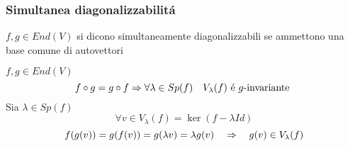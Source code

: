\subsubsection{Simultanea diagonalizzabilit\'a }
\begin{defn}\bianco
$f,g\in End(V) $ si dicono simultaneamente diagonalizzabili se ammettono una base comune di autovettori
\end{defn}
\spazio
\begin{lem}
$f,g \in End(V) $ 
$$ f \circ g = g \circ f \Rightarrow \forall \lambda\in Sp(f) \quad V_\lambda(f) \text{ \'e } g\text{-invariante } $$
\proof
Sia $\lambda \in Sp(f) $\\
$$\forall v \in V_\lambda(f)=\ker ( f - \lambda Id) $$
$$f(g(v))=g(f(v))=g(\lambda v ) = \lambda g(v) \quad \Rightarrow \quad g(v) \in V_\lambda(f)$$
\endproof
\end{lem}
\spazio
